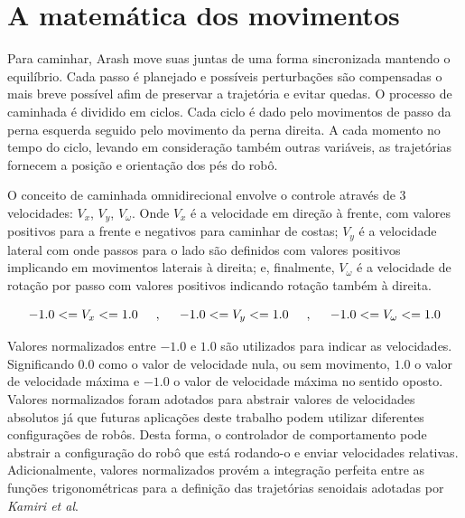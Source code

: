 \chapter{A matemática dos movimentos}
\label{ch:Math}

Para caminhar, Arash move suas juntas de uma forma sincronizada mantendo o equilíbrio. Cada passo é planejado e possíveis perturbações são compensadas o mais breve possível afim de preservar a trajetória e evitar quedas. O processo de caminhada é dividido em ciclos. Cada ciclo é dado pelo movimentos de passo da perna esquerda seguido pelo movimento da perna direita. A cada momento no tempo do ciclo, levando em consideração também outras variáveis, as trajetórias fornecem a posição e orientação dos pés do robô.

O conceito de caminhada omnidirecional envolve o controle através de 3 velocidades: $V_x$, $V_y$, $V_\omega$. Onde $V_x$ é a velocidade em direção à frente, com valores positivos para a frente e negativos para caminhar de costas; $V_y$ é a velocidade lateral com onde passos para o lado são definidos com valores positivos implicando em movimentos laterais à direita; e, finalmente, $V_\omega$ é a velocidade de rotação por passo com valores positivos indicando rotação também à direita.

\begin{equation}
-1.0 <= V_x <= 1.0
\hspace{5mm},\hspace{5mm}
-1.0 <= V_y <= 1.0
\hspace{5mm},\hspace{5mm}
-1.0 <= V_\omega <= 1.0
\label{eq:velocities_range}
\end{equation}

Valores normalizados entre $-1.0$ e $1.0$ são utilizados para indicar as velocidades. Significando $0.0$ como o valor de velocidade nula, ou sem movimento, $1.0$ o valor de velocidade máxima e $-1.0$ o valor de velocidade máxima no sentido oposto. Valores normalizados foram adotados para abstrair valores de velocidades absolutos já que futuras aplicações deste trabalho podem utilizar diferentes configurações de robôs. Desta forma, o controlador de comportamento pode abstrair a configuração do robô que está rodando-o e enviar velocidades relativas. Adicionalmente, valores normalizados provém a integração perfeita entre as funções trigonométricas para a definição das trajetórias senoidais adotadas por \textit{Kamiri et al}.

